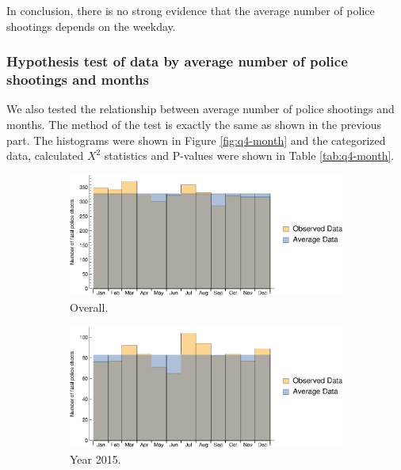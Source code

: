 \documentclass[conf]{new-aiaa}
\begin{document}
In conclusion, there is no strong evidence that the
average number of police shootings depends on the weekday.

\subsubsection{Hypothesis test of data by average number of police shootings and months}

We also tested the relationship between average number of police shootings and months. The method of the test is exactly the same as shown in the previous part. The histograms were shown in Figure \ref{fig:q4-month} and the categorized data, calculated $X^2$ statistics and P-values were shown in Table \ref{tab:q4-month}. \medskip

\begin{figure}[!htbp]
\centering
\begin{subfigure}{.75\textwidth}
  \centering
  \includegraphics[width=\linewidth]{q4/q4-month.eps}  
  \caption{Overall.}
  \label{fig:q4-month-overall}
\end{subfigure}
\begin{subfigure}{.49\textwidth}
  \centering
  \includegraphics[width=\linewidth]{q4/q4-month-2015.eps}  
  \caption{Year 2015.}
  \label{fig:q4-month-2015}
\end{subfigure}
\begin{subfigure}{.49\textwidth}

\end{subfigure}
\end{figure}
\end{document}
